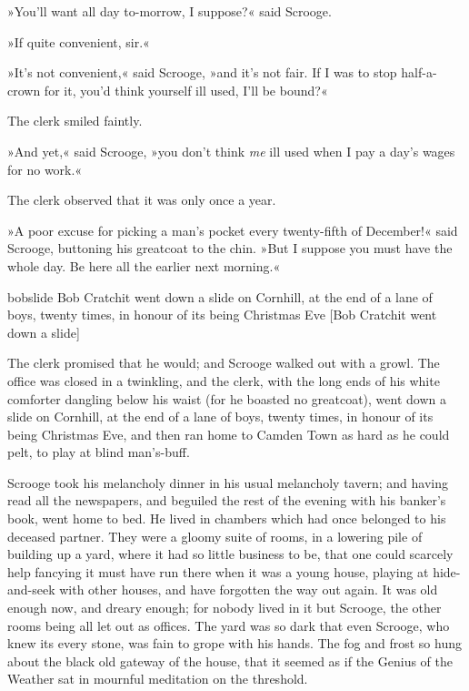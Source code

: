 »You'll want all day to-morrow, I suppose?« said Scrooge.

»If quite convenient, sir.«

»It's not convenient,« said Scrooge, »and it's not fair. If I was to stop half-a-crown for it, you'd think yourself ill used, I'll be bound?«

The clerk smiled faintly.

»And yet,« said Scrooge, »you don't think \textit{me} ill used when I pay a day's wages for no work.«

The clerk observed that it was only once a year.

»A poor excuse for picking a man's pocket every twenty-fifth of December!« said Scrooge, buttoning his greatcoat to the chin. »But I suppose you must have the whole day. Be here all the earlier next morning.«

\begin{colorbigpic}
	[\smallpicsize]
	{bobslide}
	{Bob Cratchit went down a slide on Cornhill, at the end of a lane of boys, twenty times, in honour of its being Christmas Eve}
	[Bob Cratchit went down a slide]
\end{colorbigpic}


The clerk promised that he would; and Scrooge walked out with a growl. The office was closed in a twinkling, and the clerk, with the long ends of his white comforter dangling below his waist (for he boasted no greatcoat), went down a slide on Cornhill, at the end of a lane of boys, twenty times, in honour of its being Christmas Eve, and then ran home to Camden Town as hard as he could pelt, to play at blind man's-buff.

Scrooge took his melancholy dinner in his usual melancholy tavern; and having read all the newspapers, and beguiled the rest of the evening with his banker's book, went home to bed. He lived in chambers which had once belonged to his deceased partner. They were a gloomy suite of rooms, in a lowering pile of building up a yard, where it had so little business to be, that one could scarcely help fancying it must have run there when it was a young house, playing at hide-and-seek with other houses, and have forgotten the way out again. It was old enough now, and dreary enough; for nobody lived in it but Scrooge, the other rooms being all let out as offices. The yard was so dark that even Scrooge, who knew its every stone, was fain to grope with his hands. The fog and frost so hung about the black old gateway of the house, that it seemed as if the Genius of the Weather sat in mournful meditation on the threshold.

